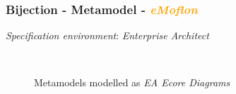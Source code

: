 \documentclass{beamer}
\begin{document}
\begin{frame}
\frametitle{Bijection - \textbf{Metamodel} - \textbf{\textit{\textcolor{orange}{eMoflon}}}}

\textit{Specification environment}: \textit{Enterprise Architect}

\begin{figure}[ht]
    \centering
    \mbox{\qquad\qquad
          }
    \caption{Metamodels modelled as \textit{EA Ecore Diagrams}}
    \label{fig:ea-MMS}
\end{figure}

\end{frame}
\end{document}
